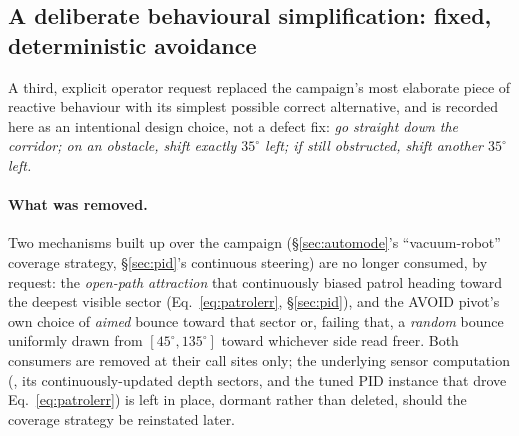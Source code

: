 \subsection{A deliberate behavioural simplification: fixed, deterministic
avoidance}
\label{sec:july24avoid}
A third, explicit operator request replaced the campaign's most elaborate
piece of reactive behaviour with its simplest possible correct
alternative, and is recorded here as an intentional design choice, not a
defect fix: \emph{go straight down the corridor; on an obstacle, shift
exactly $35^\circ$ left; if still obstructed, shift another $35^\circ$
left.}

\paragraph{What was removed.} Two mechanisms built up over the campaign
(\S\ref{sec:automode}'s ``vacuum-robot'' coverage strategy, \S\ref{sec:pid}'s
continuous steering) are no longer consumed, by request: the \emph{open-path
attraction} that continuously biased patrol heading toward the deepest
visible sector (Eq.~\ref{eq:patrolerr}, \S\ref{sec:pid}), and the AVOID
pivot's own choice of \emph{aimed} bounce toward that sector or, failing
that, a \emph{random} bounce uniformly drawn from $[45^\circ,135^\circ]$
toward whichever side read freer. Both consumers are removed at their call
sites only; the underlying sensor computation
(, its continuously-updated depth sectors, and
the tuned PID instance that drove Eq.~\ref{eq:patrolerr}) is left in
place, dormant rather than deleted, should the coverage strategy be
reinstated later.

